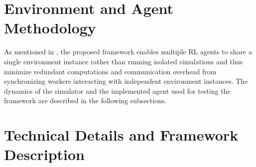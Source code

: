 

\section{Environment and Agent Methodology}
\label{sec:methodology}

As mentioned in , the proposed framework enables multiple RL agents
to share a single environment instance rather than running isolated simulations and thus
minimize redundant computations and communication overhead from synchronizing workers interacting with independent environment instances.
The dynamics of the simulator and the implemented agent used for testing the framework are described in the following subsections.




\section{Technical Details and Framework Description}
\label{sec:technical_details}



